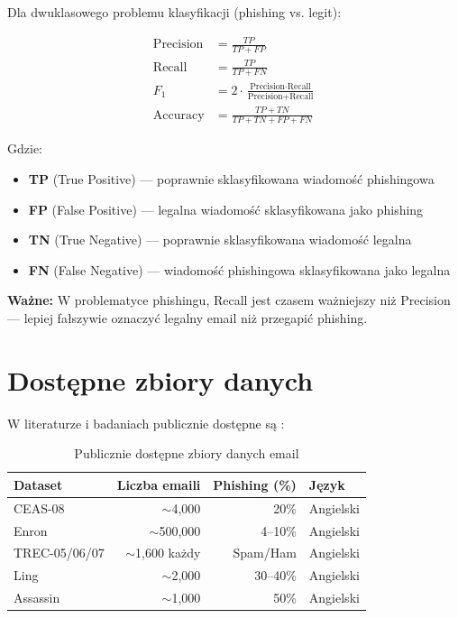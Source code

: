 \documentclass[11pt]{extreport}
\begin{document}
Dla dwuklasowego problemu klasyfikacji (phishing vs. legit):

\begin{align}
\text{Precision} &= \frac{TP}{TP + FP} \\
\text{Recall} &= \frac{TP}{TP + FN} \\
F_1 &= 2 \cdot \frac{\text{Precision} \cdot \text{Recall}}{\text{Precision} + \text{Recall}} \\
\text{Accuracy} &= \frac{TP + TN}{TP + TN + FP + FN}
\end{align}

Gdzie:
\begin{itemize}
    \item \textbf{TP} (True Positive) --- poprawnie sklasyfikowana wiadomość phishingowa
    \item \textbf{FP} (False Positive) --- legalna wiadomość sklasyfikowana jako phishing
    \item \textbf{TN} (True Negative) --- poprawnie sklasyfikowana wiadomość legalna
    \item \textbf{FN} (False Negative) --- wiadomość phishingowa sklasyfikowana jako legalna
\end{itemize}

\textbf{Ważne:} W problematyce phishingu, Recall jest czasem ważniejszy niż Precision --- lepiej fałszywie oznaczyć legalny email niż przegapić phishing.

\section{Dostępne zbiory danych}
\label{sec:datasets}

W literaturze i badaniach publicznie dostępne są \cite{apwg2023}:

\begin{table}[H]
\centering
\caption{Publicznie dostępne zbiory danych email}
\label{tab:datasets}
\begin{tabular}{@{}lrrp{3cm}@{}}
\toprule
\textbf{Dataset} & \textbf{Liczba emaili} & \textbf{Phishing (\%)} & \textbf{Język} \\ 
\midrule
CEAS-08 & $\sim$4,000 & 20\% & Angielski \\
Enron & $\sim$500,000 & 4--10\% & Angielski \\
TREC-05/06/07 & $\sim$1,600 każdy & Spam/Ham & Angielski \\
Ling & $\sim$2,000 & 30--40\% & Angielski \\
Assassin & $\sim$1,000 & 50\% & Angielski \\
\bottomrule
\end{tabular}
\end{table}
\end{document}
